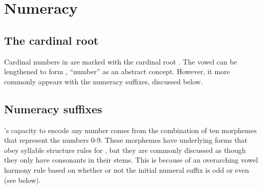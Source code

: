 \section{Numeracy}

	\subsection{The cardinal root \emph{\R\OO}}
		Cardinal numbers in {\kurango} are marked with the cardinal root \emph{\R\OO}. The vowel can be lengthened to form \emph{\R\OO\OO}, ``number'' as an abstract concept. However, it more commonly appears with the numeracy suffixes, discussed below.
	\subsection{Numeracy suffixes}
		\kurango 's capacity to encode any number comes from the combination of ten morphemes that represent the numbers 0-9. These morphemes have underlying forms that obey syllable structure rules for \kurango, but they are commonly discussed as though they only have consonants in their stems. This is because of an overarching vowel harmony rule based on whether or not the initial numeral suffix is odd or even (see below). 
